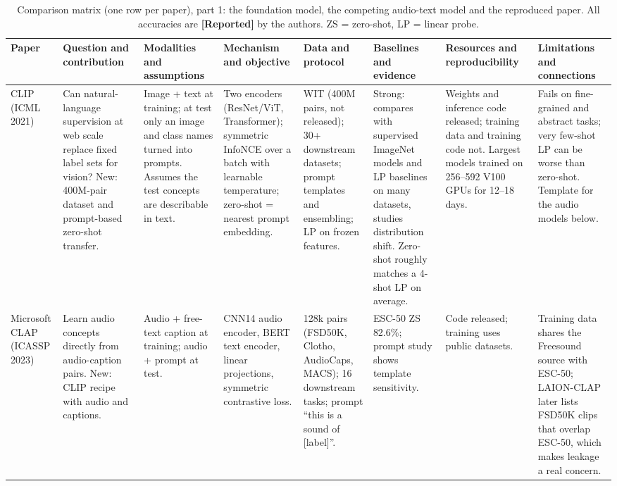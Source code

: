 \begin{landscape}
\begin{table}
\centering
\scriptsize
\caption{Comparison matrix (one row per paper), part 1: the foundation model, the competing audio-text model and the reproduced paper. All accuracies are \textbf{[Reported]} by the authors. ZS = zero-shot, LP = linear probe.}
\label{tab:matrix}
\renewcommand{\arraystretch}{1.15}
\begin{tabularx}{\linewidth}{@{}>{\raggedright\arraybackslash}p{1.75cm}*{7}{>{\raggedright\arraybackslash}X}@{}}
\toprule
Paper & Question and contribution & Modalities and assumptions & Mechanism and objective & Data and protocol & Baselines and evidence & Resources and reproducibility & Limitations and connections \\
\midrule
CLIP~\cite{radford2021clip} (ICML 2021) &
Can natural-language supervision at web scale replace fixed label sets for vision? New: 400M-pair dataset and prompt-based zero-shot transfer. &
Image + text at training; at test only an image and class names turned into prompts. Assumes the test concepts are describable in text. &
Two encoders (ResNet/ViT, Transformer); symmetric InfoNCE over a batch with learnable temperature; zero-shot = nearest prompt embedding. &
WIT (400M pairs, not released); 30+ downstream datasets; prompt templates and ensembling; LP on frozen features. &
Strong: compares with supervised ImageNet models and LP baselines on many datasets, studies distribution shift. Zero-shot roughly matches a 4-shot LP on average. &
Weights and inference code released; training data and training code not. Largest models trained on 256--592 V100 GPUs for 12--18 days. &
Fails on fine-grained and abstract tasks; very few-shot LP can be worse than zero-shot. Template for the audio models below. \\
\midrule
Microsoft CLAP~\cite{elizalde2023clap} (ICASSP 2023) &
Learn audio concepts directly from audio-caption pairs. New: CLIP recipe with audio and captions. &
Audio + free-text caption at training; audio + prompt at test. &
CNN14 audio encoder, BERT text encoder, linear projections, symmetric contrastive loss. &
128k pairs (FSD50K, Clotho, AudioCaps, MACS); 16 downstream tasks; prompt ``this is a sound of [label]''. &
ESC-50 ZS 82.6\%; prompt study shows template sensitivity. &
Code released; training uses public datasets. &
Training data shares the Freesound source with ESC-50; LAION-CLAP later lists FSD50K clips that overlap ESC-50, which makes leakage a real concern. \\

\end{tabularx}
\end{table}
\end{landscape}
